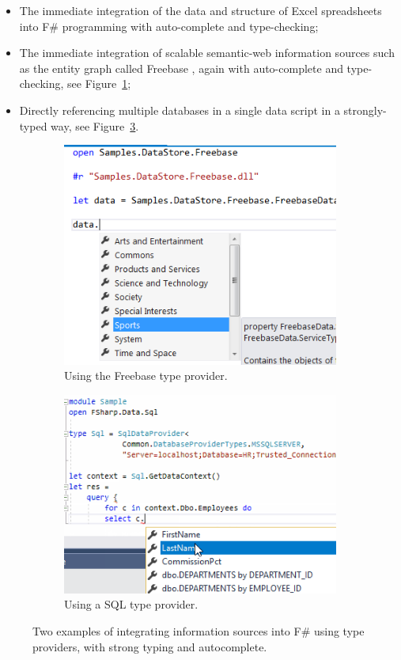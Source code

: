 \documentclass[acmsmall]{acmart}\settopmatter{}
\begin{document}
\begin{itemize}
\item The immediate integration of the data and structure of Excel spreadsheets into F\# programming with auto-complete and type-checking;
\item The immediate integration of scalable semantic-web information sources such as the entity graph called Freebase \citep{Bollacker2008}, again with auto-complete and type-checking, see Figure~\ref{fig:freebase};
\item Directly referencing multiple databases in a single data script in a strongly-typed way, see Figure~\ref{fig:sql-provider}.
\end{itemize}

\begin{figure}

  \centering
  \begin{subfigure}[b]{0.48\linewidth}
  \includegraphics[width=0.95\linewidth]{tp-freebase.png}
  \caption{Using the Freebase type provider.}
  \label{fig:freebase}
  \end{subfigure}
  \begin{subfigure}[b]{0.48\linewidth}
  \includegraphics[width=0.95\linewidth]{sql-provider.png}
  \caption{Using a SQL type provider.}
  \label{fig:sql-provider}
  \end{subfigure}
  \caption{Two examples of integrating information sources into F\# using type providers, with strong typing and autocomplete.}



\end{figure}
\end{document}
